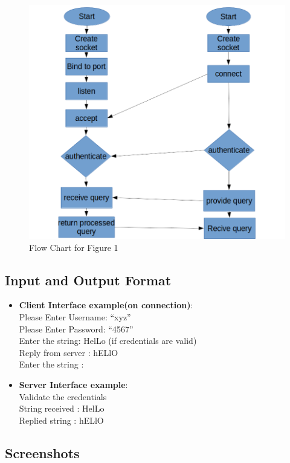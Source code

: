 \documentclass[12pt]{article}
\begin{document}
			\begin{figure}[h!]
				\centering
				\caption{Flow Chart for Figure 1}
				\includegraphics[scale=.4]{flow.png}
			\end{figure}
		
		\subsection{Input and Output Format}
		
			\begin{itemize}
				\item \textbf{Client Interface example(on connection)}:\\
				Please Enter Username: “xyz”
\\
				Please Enter Password: “4567”
\\
				Enter the string: HelLo (if credentials are valid)
\\
				Reply from server : hELlO
\\
				Enter the string :
				\item \textbf{Server Interface example}:\\ 
				Validate the credentials
\\
				String received : HelLo
\\
				Replied string : hELlO
			\end{itemize}
		
		\subsection{Screenshots}
		
\end{document}
